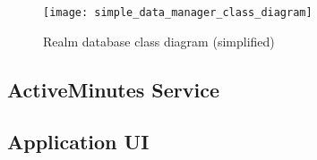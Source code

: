      
    \begin{figure}[ht]
    \centering
    \texttt{[image: simple\_data\_manager\_class\_diagram]}
    \caption{Realm database class diagram (simplified)}
    \label{fig:realm_database}
\end{figure}
    
    \subsection{ActiveMinutes Service}
    
    \subsection{Application UI}  




    
    
    
    
